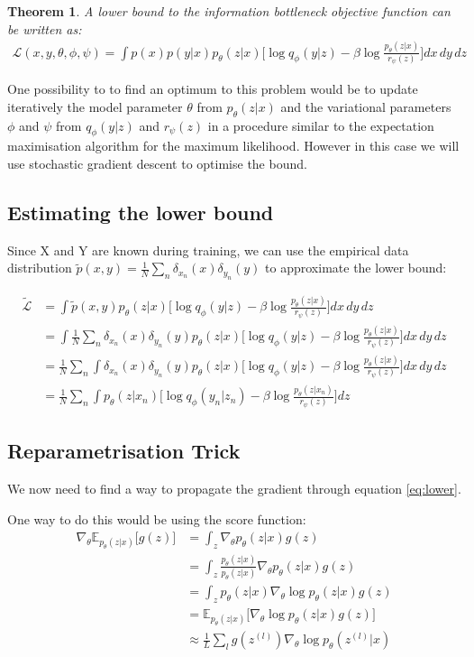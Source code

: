 \documentclass[10pt,oneside,openright]{report}
\newtheorem{theorem}{Theorem}
\begin{document}
\begin{theorem}
A lower bound to the information bottleneck objective function can be written as:
 \begin{align}
\mathcal{L}(x, y, \theta, \phi, \psi) = \int p(x) p(y|x) p_\theta(z|x) \Big[ \log q_\phi(y|z) - \beta  \log \frac{p_\theta(z|x)}{r_\psi(z)}\Big] dx\, dy\, dz
\end{align}
\end{theorem}

One possibility to to find an optimum to this problem would be to update iteratively the model parameter $\theta$ from $p_\theta(z|x)$  and the variational parameters $\phi$ and $\psi$ from $q_\phi(y|z)$ and $r_\psi(z)$ in a procedure similar to the expectation maximisation algorithm for the maximum likelihood. However in this case we will use stochastic gradient descent to optimise the bound.

\subsection{Estimating the lower bound}
Since X and Y are known during training, we can use the empirical data distribution $\tilde{p}(x, y) = \frac{1}{N}\sum_n\delta_{x_n}(x)\delta_{y_n}(y)$ to approximate the lower bound:

 \begin{align}
\tilde{\mathcal{L}} & = \int \tilde{p}(x, y) p_\theta(z|x) \Big[\log q_\phi(y|z) - \beta \log \frac{p_\theta(z|x)}{r_\psi(z)} \Big]dx\, dy\, dz  \\
   & = \int \frac{1}{N}\sum_n\delta_{x_n}(x)\delta_{y_n}(y) p_\theta(z|x) \Big[\log q_\phi(y|z) - \beta \log \frac{p_\theta(z|x)}{r_\psi(z)} \Big] dx\, dy\, dz \\
   & = \frac{1}{N}\sum_n \int \delta_{x_n}(x)\delta_{y_n}(y) p_\theta(z|x) \Big[ \log q_\phi(y|z) - \beta \log \frac{p_\theta(z|x)}{r_\psi(z)}\Big ] dx\, dy\, dz \\
   & = \frac{1}{N}\sum_n \int p_\theta(z|x_n) \Big[  \log q_\phi(y_n|z_n) - \beta   \log \frac{p_\theta(z|x_n)}{r_\psi(z)} \Big] dz \label{eq:lower}
\end{align}


\subsection{Reparametrisation Trick}
We now need to find a way to propagate the gradient through equation \ref{eq:lower}. 

One way to do this would be using the score function:
 \begin{align}
\nabla_\theta \mathbb{E}_{p_\theta(z|x)}\big[ g(z) \big] &= \int_z \nabla_\theta p_\theta(z|x)  g(z)\\
 &= \int_z \frac{p_\theta(z|x)}{p_\theta(z|x)} \nabla_\theta p_\theta(z|x)  g(z) \\
 &= \int_z p_\theta(z|x) \nabla_\theta \log p_\theta(z|x)  g(z)\\
&= \mathbb{E}_{p_\theta(z|x)}\big[ \nabla_\theta \log p_\theta(z|x) g(z)  \big]\\
&\approx \frac{1}{L} \sum_l  g(z^{(l)}) \nabla_\theta \log p_\theta(z^{(l)}|x)
\end{align}
\end{document}
